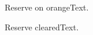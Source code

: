 \documentclass[aspectratio=169]{beamer}
\begin{document}
\begin{frame}{Reserve on orange}Text.\end{frame}
\floraclearreserve
\begin{frame}{Reserve cleared}Text.\end{frame}
\end{document}
